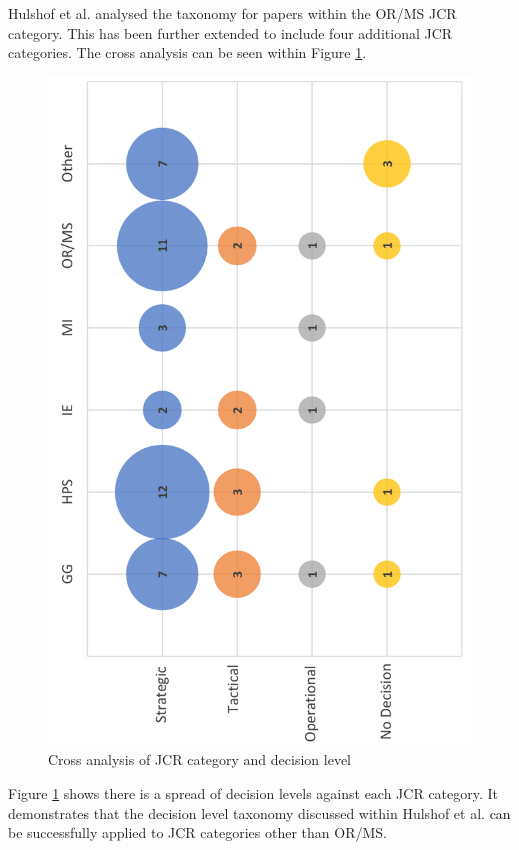 \documentclass[../thesis.tex]{subfiles}
\begin{document}
Hulshof et al. \cite{PHulshof} analysed the taxonomy for papers within the OR/MS JCR category. This has been further extended to include four additional JCR categories. The cross analysis can be seen within Figure \ref{fig:PlanningJCR}.

\begin{figure}[H]
\centering
 \includegraphics[scale = 0.5,angle=270]{Chapter2/Figures/JCRDecision1.pdf}
 \caption{Cross analysis of JCR category and decision level}
   
    \label{fig:PlanningJCR}
\end{figure}

Figure \ref{fig:PlanningJCR} shows there is a spread of decision levels against each JCR category. It demonstrate\textcolor{black}{s} that the decision level taxonomy discussed within Hulshof et al. \cite{PHulshof} \textcolor{black}{can} be successfully applied to JCR categories other than OR/MS. 
\end{document}
